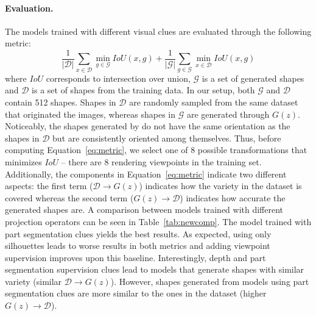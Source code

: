 \paragraph*{Evaluation.}
The models trained with different visual clues are evaluated through the following metric:
\begin{equation}
	\frac{1}{|\mathcal{D}|}\sum_{x \in \mathcal{D}} \min_{g \in \mathcal{G}} IoU(x, g) +
	\frac{1}{|\mathcal{G}|}\sum_{g \in \mathcal{G}} \min_{x \in \mathcal{D}} IoU(x, g) 
	\label{eq:metric}
\end{equation}
where $IoU$ corresponds to intersection over union, $\mathcal{G}$ is a set of generated shapes and
$\mathcal{D}$ is a set of shapes from the training data.
In our setup, both $\mathcal{G}$ and $\mathcal{D}$ contain 512 shapes.
Shapes in $\mathcal{D}$ are randomly sampled from the same dataset that originated the images,
whereas shapes in $\mathcal{G}$ are generated through $G(z)$.
Noticeably, the shapes generated by \prgan do not have the same orientation as the shapes
in $\mathcal{D}$ but are consistently oriented among themselves.
Thus, before computing Equation~\ref{eq:metric}, we select one of 8 possible transformations that minimizes
$IoU$ -- there are 8 rendering viewpoints in the training set.
Additionally, the components in Equation~\ref{eq:metric} indicate two different aspects:
the first term ($\mathcal{D}\rightarrow G(z)$) indicates how the variety in the dataset is covered whereas 
the second term ($G(z)\rightarrow \mathcal{D}$) indicates how accurate the generated shapes are.
A comparison between models trained with different projection operators can be seen in
Table~\ref{tab:newcomp}.
The model trained with part segmentation clues yields the best results.
As expected, using only silhouettes leads to worse results in both metrics and adding viewpoint
supervision improves upon this baseline.
Interestingly, depth and part segmentation supervision clues lead to models that generate shapes
with similar variety (similar $\mathcal{D}\rightarrow G(z)$).
However, shapes generated from models using part segmentation clues are more similar to the ones
in the dataset (higher $G(z)\rightarrow \mathcal{D}$).

